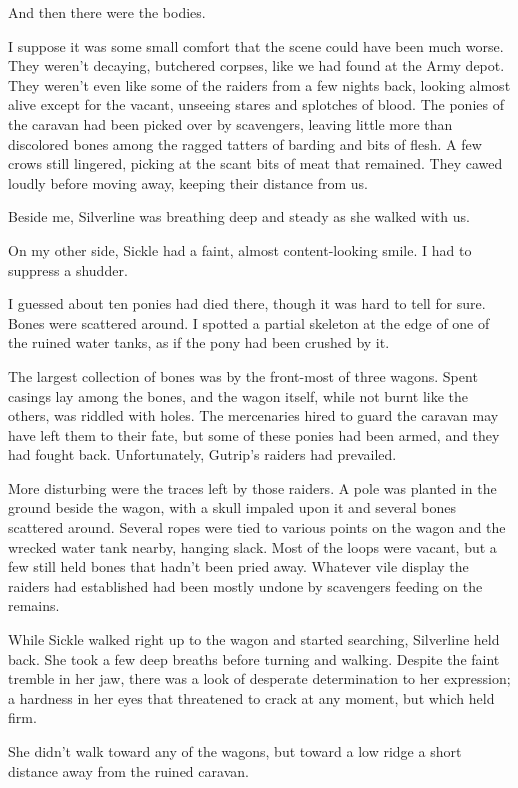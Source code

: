And then there were the bodies.

I suppose it was some small comfort that the scene could have been much worse. They weren’t decaying, butchered corpses, like we had found at the Army depot. They weren’t even like some of the raiders from a few nights back, looking almost alive except for the vacant, unseeing stares and splotches of blood. The ponies of the caravan had been picked over by scavengers, leaving little more than discolored bones among the ragged tatters of barding and bits of flesh. A few crows still lingered, picking at the scant bits of meat that remained. They cawed loudly before moving away, keeping their distance from us.

Beside me, Silverline was breathing deep and steady as she walked with us.

On my other side, Sickle had a faint, almost content-looking smile. I had to suppress a shudder.

I guessed about ten ponies had died there, though it was hard to tell for sure. Bones were scattered around. I spotted a partial skeleton at the edge of one of the ruined water tanks, as if the pony had been crushed by it.

The largest collection of bones was by the front-most of three wagons. Spent casings lay among the bones, and the wagon itself, while not burnt like the others, was riddled with holes. The mercenaries hired to guard the caravan may have left them to their fate, but some of these ponies had been armed, and they had fought back. Unfortunately, Gutrip’s raiders had prevailed.

More disturbing were the traces left by those raiders. A pole was planted in the ground beside the wagon, with a skull impaled upon it and several bones scattered around. Several ropes were tied to various points on the wagon and the wrecked water tank nearby, hanging slack. Most of the loops were vacant, but a few still held bones that hadn’t been pried away. Whatever vile display the raiders had established had been mostly undone by scavengers feeding on the remains.

While Sickle walked right up to the wagon and started searching, Silverline held back. She took a few deep breaths before turning and walking. Despite the faint tremble in her jaw, there was a look of desperate determination to her expression; a hardness in her eyes that threatened to crack at any moment, but which held firm.

She didn’t walk toward any of the wagons, but toward a low ridge a short distance away from the ruined caravan.


